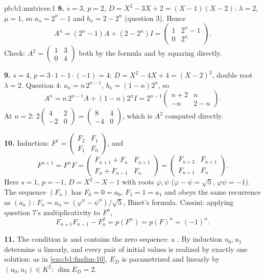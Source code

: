\begin{solution}{pb:b1:matrices:1}
\textbf{8.} $s = 3$, $p = 2$, $D = X^2 - 3X + 2 = (X - 1)(X -
2)$: $\lambda = 2$, $\mu = 1$, so $a_n = 2^n - 1$ and $b_n = 2 -
2^n$ (question 3). Hence
\[
A^n = (2^n - 1)A + (2 - 2^n)I
= \begin{pmatrix} 1 & 2^n - 1\\ 0 & 2^n \end{pmatrix}.
\]
Check: $A^2 = \begin{pmatrix} 1 & 3\\ 0 & 4\end{pmatrix}$ both
by the formula and by squaring directly.

\textbf{9.} $s = 4$, $p = 3\cdot1 - 1\cdot(-1) = 4$: $D = X^2 -
4X + 4 = (X - 2)^2$, double root $\lambda = 2$. Question 4: $a_n
= n\,2^{n-1}$, $b_n = (1 - n)2^n$, so
\[
A^n = n\,2^{n-1}A + (1 - n)2^n I
= 2^{n-1}\begin{pmatrix} n + 2 & n\\ -n & 2 - n
\end{pmatrix}.
\]
At $n = 2$: $2\begin{pmatrix} 4 & 2\\ -2 & 0\end{pmatrix} =
\begin{pmatrix} 8 & 4\\ -4 & 0 \end{pmatrix}$, which is $A^2$
computed directly.

\textbf{10.} Induction: $F^1 = \begin{pmatrix} F_2 & F_1\\ F_1 &
F_0\end{pmatrix}$, and
\[
F^{n+1} = F^n F =
\begin{pmatrix} F_{n+1} + F_n & F_{n+1}\\
F_n + F_{n-1} & F_n \end{pmatrix}
= \begin{pmatrix} F_{n+2} & F_{n+1}\\ F_{n+1} & F_n
\end{pmatrix}.
\]
Here $s = 1$, $p = -1$, $D = X^2 - X - 1$ with roots $\varphi,
\psi$ ($\varphi - \psi = \sqrt5$, $\varphi\psi = -1$). The
sequence $(F_n)$ has $F_0 = 0 = a_0$, $F_1 = 1 = a_1$ and obeys
the same recurrence as $(a_n)$: $F_n = a_n = (\varphi^n -
\psi^n)/\sqrt5$, Binet's formula. Cassini: applying question 7's
multiplicativity to $F^n$,
\[
F_{n+1}F_{n-1} - F_n^2 = p(F^n) = p(F)^n = (-1)^n .
\]

\textbf{11.} The condition is  and contains the zero
sequence: a . By induction $u_0, u_1$ determine $u$
linearly, and every pair of initial values is realized by
exactly one solution: as in \cref{exo:b1:findim:10}, $E_D$ is
parametrized  and linearly by $(u_0, u_1) \in K^2$:
$\dim E_D = 2$.


\end{solution}
